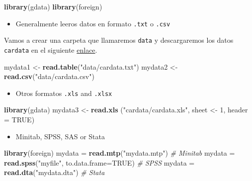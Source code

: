 \documentclass[]{book}
\newenvironment{Shaded}{\begin{snugshade}}{\end{snugshade}}
\newcommand{\KeywordTok}[1]{\textcolor[rgb]{0.13,0.29,0.53}{\textbf{#1}}}
\newcommand{\DataTypeTok}[1]{\textcolor[rgb]{0.13,0.29,0.53}{#1}}
\newcommand{\DecValTok}[1]{\textcolor[rgb]{0.00,0.00,0.81}{#1}}
\newcommand{\StringTok}[1]{\textcolor[rgb]{0.31,0.60,0.02}{#1}}
\newcommand{\CommentTok}[1]{\textcolor[rgb]{0.56,0.35,0.01}{\textit{#1}}}
\newcommand{\OtherTok}[1]{\textcolor[rgb]{0.56,0.35,0.01}{#1}}
\newcommand{\NormalTok}[1]{#1}
\providecommand{\tightlist}{%
  \setlength{\itemsep}{0pt}\setlength{\parskip}{0pt}}
\begin{document}
\begin{Shaded}
\begin{Highlighting}[]
\KeywordTok{library}\NormalTok{(gdata)}
\KeywordTok{library}\NormalTok{(foreign)}
\end{Highlighting}
\end{Shaded}

\bigskip

\begin{itemize}
\tightlist
\item
  Generalmente leeros datos en formato \texttt{.txt} o \texttt{.csv}
\end{itemize}

Vamos a crear una carpeta que llamaremos \texttt{data} y descargaremos
los datos \texttt{cardata} en el siguiente
\href{http://idaejin.github.io/courses/R/data/cardata.zip}{enlace}.

\begin{Shaded}
\begin{Highlighting}[]
\NormalTok{mydata1 <-}\StringTok{ }\KeywordTok{read.table}\NormalTok{(}\StringTok{"data/cardata.txt"}\NormalTok{) }
\NormalTok{mydata2 <-}\StringTok{ }\KeywordTok{read.csv}\NormalTok{(}\StringTok{"data/cardata.csv"}\NormalTok{)  }
\end{Highlighting}
\end{Shaded}

\begin{itemize}
\tightlist
\item
  Otros formatos \texttt{.xls} and \texttt{.xlsx}
\end{itemize}

\begin{Shaded}
\begin{Highlighting}[]
\KeywordTok{library}\NormalTok{(gdata)}
\NormalTok{mydata3 <-}\StringTok{ }\KeywordTok{read.xls}\NormalTok{ (}\StringTok{"cardata/cardata.xls"}\NormalTok{, sheet <-}\StringTok{ }\DecValTok{1}\NormalTok{, }\DataTypeTok{header =} \OtherTok{TRUE}\NormalTok{)}
\end{Highlighting}
\end{Shaded}

\begin{itemize}
\tightlist
\item
  Minitab, SPSS, SAS or Stata
\end{itemize}

\begin{Shaded}
\begin{Highlighting}[]
\KeywordTok{library}\NormalTok{(foreign)                   }
\NormalTok{mydata =}\StringTok{ }\KeywordTok{read.mtp}\NormalTok{(}\StringTok{"mydata.mtp"}\NormalTok{)  }\CommentTok{# Minitab}
\NormalTok{mydata =}\StringTok{ }\KeywordTok{read.spss}\NormalTok{(}\StringTok{"myfile"}\NormalTok{, }\DataTypeTok{to.data.frame=}\OtherTok{TRUE}\NormalTok{) }\CommentTok{# SPSS}
\NormalTok{mydata =}\StringTok{ }\KeywordTok{read.dta}\NormalTok{(}\StringTok{"mydata.dta"}\NormalTok{) }\CommentTok{# Stata}
\end{Highlighting}
\end{Shaded}
\end{document}
